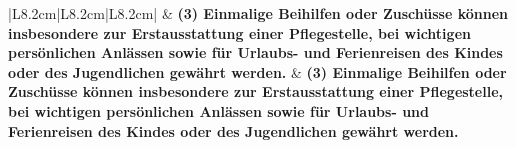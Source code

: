 \documentclass[10pt,a4paper,landscape]{article}
\begin{document}
\begin{longtable}{|L{8.2cm}|L{8.2cm}|L{8.2cm}|}
\hhline{|---|}
 & \textbf{(3) Einmalige Beihilfen oder Zuschüsse  \newline können insbesondere zur  \newline Erstausstattung einer Pflegestelle, bei  \newline wichtigen persönlichen Anlässen sowie  \newline für Urlaubs- und Ferienreisen des  \newline Kindes oder des Jugendlichen gewährt  \newline werden. } & \textbf{(3) Einmalige Beihilfen oder Zuschüsse  \newline können insbesondere zur  \newline Erstausstattung einer Pflegestelle, bei  \newline wichtigen persönlichen Anlässen sowie  \newline für Urlaubs- und Ferienreisen des  \newline Kindes oder des Jugendlichen gewährt  \newline werden. } \\
\hhline{|---|}

\end{longtable}
\end{document}
